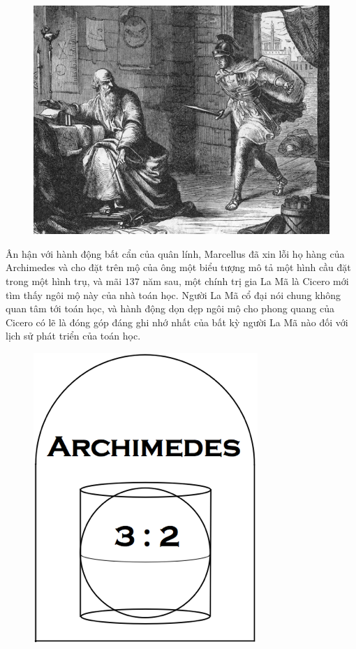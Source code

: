 \begin{multicols}{2}
\begin{figure}[H]
		\includegraphics[width= 1\linewidth]{2}
		\vspace*{-15pt}
	\end{figure}
	Ân hận với hành động bất cẩn của quân lính, Marcellus đã xin lỗi họ hàng của Archimedes và cho đặt trên mộ của ông một biểu tượng mô tả một hình cầu đặt trong một hình trụ, và mãi $137$ năm sau, một chính trị gia La Mã là Cicero mới tìm thấy ngôi mộ này của nhà toán học. Người La Mã cổ đại nói chung không quan tâm tới toán học, và hành động dọn dẹp ngôi mộ cho phong quang của Cicero có lẽ là đóng góp đáng ghi nhớ nhất của bất kỳ người La Mã nào đối với lịch sử phát triển của toán học.
	\begin{figure}[H]
		\vspace*{-5pt}
		\centering
		\captionsetup{labelformat= empty, justification=centering}
		\includegraphics[width= 0.9\linewidth]{3}

\end{figure}
\end{multicols}

